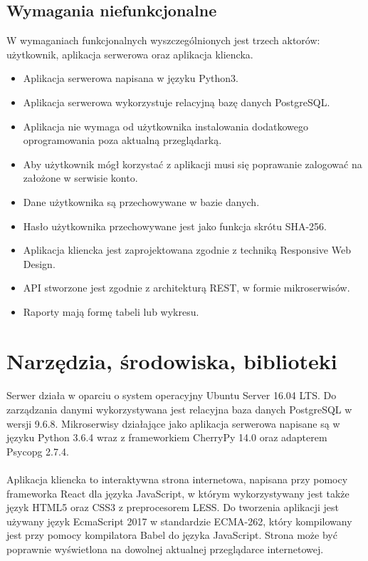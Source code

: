 \documentclass{article}
\begin{document}
	\subsection{Wymagania niefunkcjonalne}
	W wymaganiach funkcjonalnych wyszczególnionych jest trzech aktorów: użytkownik, aplikacja serwerowa oraz aplikacja kliencka.
	\begin{itemize}
		\item Aplikacja serwerowa napisana w języku Python3.
		\item Aplikacja serwerowa wykorzystuje relacyjną bazę danych PostgreSQL.
		\item Aplikacja nie wymaga od użytkownika instalowania dodatkowego oprogramowania poza aktualną przeglądarką.
		\item Aby użytkownik mógł korzystać z aplikacji musi się poprawanie zalogować na założone w serwisie konto.
		\item Dane użytkownika są przechowywane w bazie danych.
		\item Hasło użytkownika przechowywane jest jako funkcja skrótu SHA-256.
		\item Aplikacja kliencka jest zaprojektowana zgodnie z techniką Responsive Web Design.
		\item API stworzone jest zgodnie z architekturą REST, w formie mikroserwisów.
		\item Raporty mają formę tabeli lub wykresu.
	\end{itemize}
	\section{Narzędzia, środowiska, biblioteki}
	\paragraph{}Serwer działa w oparciu o system operacyjny Ubuntu Server 16.04 LTS.
	Do zarządzania danymi wykorzystywana jest relacyjna baza danych PostgreSQL w wersji 9.6.8.
	Mikroserwisy działające jako aplikacja serwerowa napisane są w języku Python 3.6.4 wraz z frameworkiem CherryPy 14.0 oraz adapterem Psycopg 2.7.4. \\
	\paragraph*{} Aplikacja kliencka to interaktywna strona internetowa, napisana przy pomocy frameworka React dla języka JavaScript, w którym wykorzystywany jest także język HTML5 oraz CSS3 z preprocesorem LESS. Do tworzenia aplikacji jest używany język EcmaScript 2017 w standardzie ECMA-262, który kompilowany jest przy pomocy kompilatora Babel do języka JavaScript. Strona może być poprawnie wyświetlona na dowolnej aktualnej przeglądarce internetowej. \\
\end{document}
